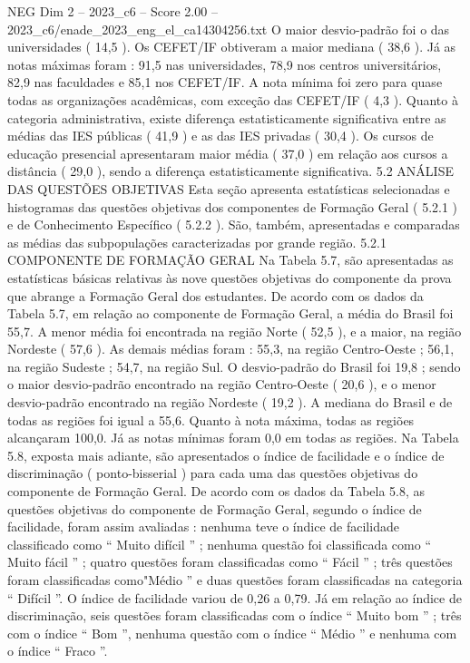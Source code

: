\begin{textsample}{NEG Dim 2 – 2023\_c6 – Score 2.00 – 2023\_c6/enade\_2023\_eng\_el\_ca14304256.txt}
O maior desvio-padrão foi o das universidades ( 14,5 ).
Os CEFET/IF obtiveram a maior mediana ( 38,6 ).
Já as notas máximas foram : 91,5 nas universidades, 78,9 nos centros universitários, 82,9 nas faculdades e 85,1 nos CEFET/IF.
A nota mínima foi zero para quase todas as organizações acadêmicas, com exceção das CEFET/IF ( 4,3 ).
Quanto à categoria administrativa, existe diferença estatisticamente significativa entre as médias das IES públicas ( 41,9 ) e as das IES privadas ( 30,4 ).
Os cursos de educação presencial apresentaram maior média ( 37,0 ) em relação aos cursos a distância ( 29,0 ), sendo a diferença estatisticamente significativa. 5.2 ANÁLISE DAS QUESTÕES OBJETIVAS Esta seção apresenta estatísticas selecionadas e histogramas das questões objetivas dos componentes de Formação Geral ( 5.2.1 ) e de Conhecimento Específico ( 5.2.2 ).
São, também, apresentadas e comparadas as médias das subpopulações caracterizadas por grande região. 5.2.1 COMPONENTE DE FORMAÇÃO GERAL Na Tabela 5.7, são apresentadas as estatísticas básicas relativas às nove questões objetivas do componente da prova que abrange a Formação Geral dos estudantes.
De acordo com os dados da Tabela 5.7, em relação ao componente de Formação Geral, a média do Brasil foi 55,7.
A menor média foi encontrada na região Norte ( 52,5 ), e a maior, na região Nordeste ( 57,6 ).
As demais médias foram : 55,3, na região Centro-Oeste ; 56,1, na região Sudeste ; 54,7, na região Sul.
O desvio-padrão do Brasil foi 19,8 ; sendo o maior desvio-padrão encontrado na região Centro-Oeste ( 20,6 ), e o menor desvio-padrão encontrado na região Nordeste ( 19,2 ).
A mediana do Brasil e de todas as regiões foi igual a 55,6.
Quanto à nota máxima, todas as regiões alcançaram 100,0.
Já as notas mínimas foram 0,0 em todas as regiões.
Na Tabela 5.8, exposta mais adiante, são apresentados o índice de facilidade e o índice de discriminação ( ponto-bisserial ) para cada uma das questões objetivas do componente de Formação Geral.
De acordo com os dados da Tabela 5.8, as questões objetivas do componente de Formação Geral, segundo o índice de facilidade, foram assim avaliadas : nenhuma teve o índice de facilidade classificado como “ Muito difícil ” ; nenhuma questão foi classificada como “ Muito fácil ” ; quatro questões foram classificadas como “ Fácil ” ; três questões foram classificadas como"Médio ” e duas questões foram classificadas na categoria “ Difícil ”.
O índice de facilidade variou de 0,26 a 0,79.
Já em relação ao índice de discriminação, seis questões foram classificadas com o índice “ Muito bom ” ; três com o índice “ Bom ”, nenhuma questão com o índice “ Médio ” e nenhuma com o índice “ Fraco ”.

\end{textsample}
